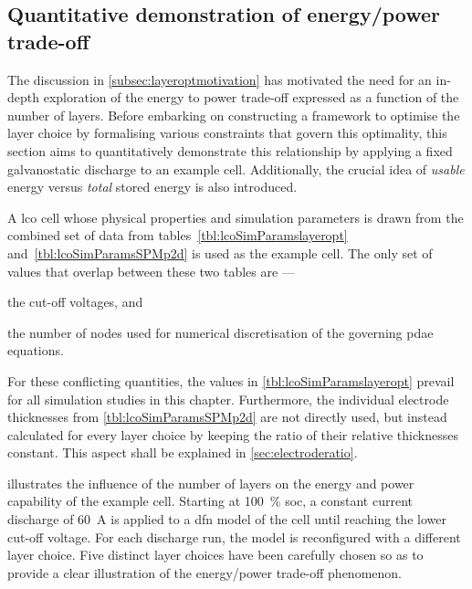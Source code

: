 \FloatBarrier

\subsection{Quantitative demonstration of energy/power trade-off}\label{sec:energypowertradeoffdemo}

The discussion in \cref{subsec:layeroptmotivation} has motivated the need for an
in-depth exploration of the energy to power trade-off expressed as a function of
the number of  layers. Before embarking on constructing a  framework to optimise
the layer choice by formalising various constraints that govern this optimality,
this section aims to quantitatively  demonstrate this relationship by applying a
fixed galvanostatic discharge to an example cell. Additionally, the crucial idea
of \emph{usable} energy versus \emph{total} stored energy is also introduced.

A  \gls{lco}  cell  whose  physical  properties  and  simulation  parameters  is
drawn from  the combined set of  data from tables~\ref{tbl:lcoSimParamslayeropt}
and~\ref{tbl:lcoSimParamsSPMp2d} is  used as the  example cell. The only  set of
values that overlap between these two tables are ---
\begin{enumerate*}[label=\itshape\alph*\upshape)]
    \item the cut-off voltages, and
    \item the number of nodes  used for numerical  discretisation of  the governing  \gls{pdae} equations.
\end{enumerate*}
For these conflicting quantities,  the values in \cref{tbl:lcoSimParamslayeropt}
prevail for all simulation studies  in this chapter. Furthermore, the individual
electrode thicknesses from \cref{tbl:lcoSimParamsSPMp2d}  are not directly used,
but  instead  calculated  for  every  layer  choice  by  keeping  the  ratio  of
their  relative  thicknesses  constant.  This   aspect  shall  be  explained  in
\cref{sec:electroderatio}.

  illustrates  the  influence  of  the  number
of  layers   on  the  energy   and  power   capability  of  the   example  cell.
Starting  at  \SI{100}{\percent}  \gls{soc},  a constant  current  discharge  of
\SI{60}{\ampere}\footnotemark{}  is applied  to a  \gls{dfn} model  of the  cell
until reaching the  lower cut-off voltage. For each discharge  run, the model is
reconfigured with  a different  layer choice. Five  distinct layer  choices have
been carefully chosen so as to  provide a clear illustration of the energy/power
trade-off phenomenon.

